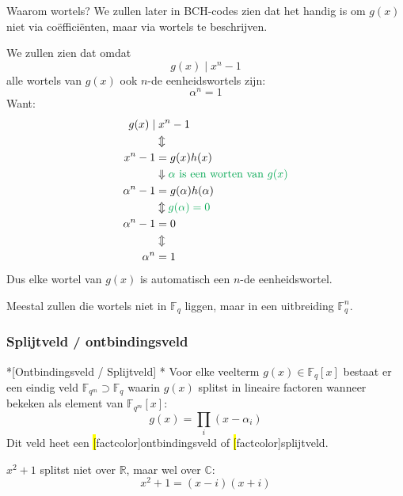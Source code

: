 Waarom wortels? We zullen later in BCH-codes zien dat het handig is om $g(x)$ niet via coëfficiënten, maar via wortels te beschrijven.

We zullen zien dat omdat
\begin{equation*}
    g(x) \mid x^n-1
\end{equation*}
alle wortels van $g(x)$ ook $n$-de eenheidswortels zijn:
\begin{equation*}
    \alpha^n = 1
\end{equation*}
Want:
\begin{equation*}
    \begin{aligned}
        g(x) \mid &\;x^n-1 \\
        &\Updownarrow \\
        x^n-1 &= g(x)h(x) \\
        &\Downarrow \textcolor{Green}{\alpha \text{ is een worten van } g(x)} \\
        \alpha^n-1 &= g(\alpha)h(\alpha) \\
        &\Updownarrow \textcolor{Green}{g(\alpha)=0} \\
        \alpha^n-1 &= 0 \\
        &\Updownarrow \\
        \alpha^n &= 1
    \end{aligned}
\end{equation*}
Dus elke wortel van $g(x)$ is automatisch een $n$-de eenheidswortel.

Meestal zullen die wortels niet in $\mathbb{F}_q$ liggen, maar in een uitbreiding $\mathbb{F}_q^n$.

\subsubsection{Splijtveld / ontbindingsveld}

\begin{nicefact}*[Ontbindingsveld / Splijtveld]
    \nextpart[]*
    Voor elke veelterm $g(x) \in \mathbb{F}_q\left[x\right]$ bestaat er een eindig veld $\mathbb{F}_{q^m} \supset \mathbb{F}_q$ waarin $g(x)$ splitst in lineaire factoren wanneer bekeken als element van $\mathbb{F}_{q^m}\left[x\right]$:
    \begin{equation*}
        g(x) = \prod_i (x-\alpha_i)
    \end{equation*}
    Dit veld heet een \hl[factcolor]{ontbindingsveld} of \hl[factcolor]{splijtveld}.
\end{nicefact}

 $x^2+1$ splitst niet over $\mathbb{R}$, maar wel over $\mathbb{C}$:
\begin{equation*}
    x^2+1 = (x-i)(x+i)
\end{equation*}

